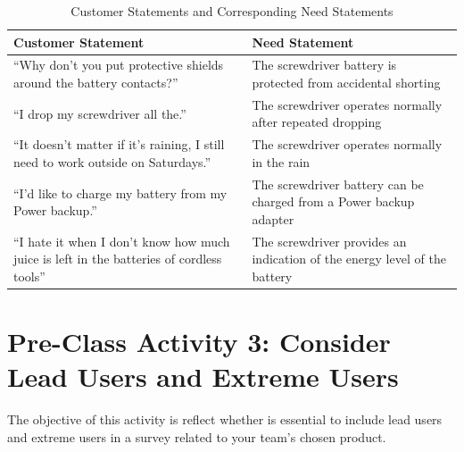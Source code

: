 \begin{table}[h!]
\centering
\begin{tabular}{|p{7cm}|p{7cm}|}
\hline
\textbf{Customer Statement} & \textbf{Need Statement} \\
\hline
“Why don’t you put protective shields around the battery contacts?” & The screwdriver battery is protected from accidental shorting \\
\hline
“I drop my screwdriver all the.” & The screwdriver operates normally after repeated dropping \\
\hline
“It doesn’t matter if it’s raining, I still need to work outside on Saturdays.” & The screwdriver operates normally in the rain \\
\hline
“I’d like to charge my battery from my Power backup.” & The screwdriver battery can be charged from a Power backup adapter \\
\hline
“I hate it when I don’t know how much juice is left in the batteries of cordless tools” & The screwdriver provides an indication of the energy level of the battery \\
\hline
\end{tabular}
\caption{Customer Statements and Corresponding Need Statements}
\end{table}


\section{Pre-Class Activity 3: Consider Lead Users and Extreme Users}



The objective of this activity is reflect whether is essential to include lead users and extreme users in a survey related to your team's chosen product.

